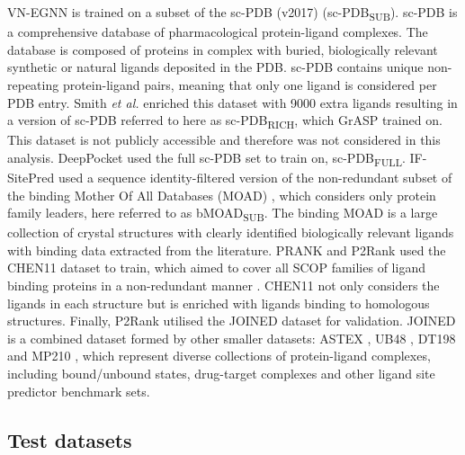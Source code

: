 VN-EGNN is trained on a subset \cite{KANDEL_2021_PURESNET} of the sc-PDB (v2017) \cite{PAUL_2004_SCPDB, KELLENBERGER_2006_SCPDB, MESLAMANI_2011_SCPDB, DESAPHY_2015_SCPDB} (sc-PDB\textsubscript{SUB}). sc-PDB is a comprehensive database of pharmacological protein-ligand complexes. The database is composed of proteins in complex with buried, biologically relevant synthetic or natural ligands deposited in the PDB. sc-PDB contains unique non-repeating protein-ligand pairs, meaning that only one ligand is considered per PDB entry. Smith \textit{et al.} \cite{SMITH_2024_GrASP} enriched this dataset with 9000 extra ligands resulting in a version of sc-PDB referred to here as sc-PDB\textsubscript{RICH}, which GrASP trained on. This dataset is not publicly accessible and therefore was not considered in this analysis. DeepPocket used the full sc-PDB set to train on, sc-PDB\textsubscript{FULL}. IF-SitePred used a sequence identity-filtered version of the non-redundant subset of the binding Mother Of All Databases (MOAD) \cite{HU_2005_BMOAD, BENSON_2008_BMOAD, AHMED_2015_BMOAD, SMITH_2019_BMOAD}, which considers only protein family leaders, here referred to as bMOAD\textsubscript{SUB}. The binding MOAD is a large collection of crystal structures with clearly identified biologically relevant ligands with binding data extracted from the literature. PRANK and P2Rank used the CHEN11 dataset to train, which aimed to cover all SCOP \cite{HUBBARD_1997_SCOP, HUBBARD_1998_SCOP, LOCONTE_2000_SCOP} families of ligand binding proteins in a non-redundant manner \cite{CHEN_2011_ASSESSMENT}. CHEN11 not only considers the ligands in each structure but is enriched with ligands binding to homologous structures. Finally, P2Rank utilised the JOINED dataset for validation. JOINED is a combined dataset formed by other smaller datasets: ASTEX \cite{HARTSHORN_2007_ASTEX}, UB48 \cite{HUANG_2006_BU48}, DT198 \cite{ZHANG_2011_METAPOCKET} and MP210 \cite{HUANG_2009_METAPOCKET}, which represent diverse collections of protein-ligand complexes, including bound/unbound states, drug-target complexes and other ligand site predictor benchmark sets.

\subsection{Test datasets}

